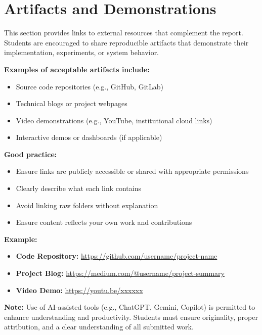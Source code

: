 \documentclass{article}
\begin{document}
\section{Artifacts and Demonstrations}

This section provides links to external resources that complement the report.
Students are encouraged to share reproducible artifacts that demonstrate their
implementation, experiments, or system behavior.

\textbf{Examples of acceptable artifacts include:}
\begin{itemize}[noitemsep]
    \item Source code repositories (e.g., GitHub, GitLab)
    \item Technical blogs or project webpages
    \item Video demonstrations (e.g., YouTube, institutional cloud links)
    \item Interactive demos or dashboards (if applicable)
\end{itemize}

\textbf{Good practice:}
\begin{itemize}[noitemsep]
    \item Ensure links are publicly accessible or shared with appropriate permissions
    \item Clearly describe what each link contains
    \item Avoid linking raw folders without explanation
    \item Ensure content reflects your own work and contributions
\end{itemize}

\textbf{Example:}
\begin{itemize}[noitemsep]
    \item \textbf{Code Repository:} \url{https://github.com/username/project-name}
    \item \textbf{Project Blog:} \url{https://medium.com/@username/project-summary}
    \item \textbf{Video Demo:} \url{https://youtu.be/xxxxxx}
\end{itemize}

\textbf{Note:}
Use of AI-assisted tools (e.g., ChatGPT, Gemini, Copilot) is permitted to enhance
understanding and productivity. Students must ensure originality, proper attribution,
and a clear understanding of all submitted work.


\vfill\pagebreak
{\fontsize{8}{9}\selectfont


}
\end{document}
